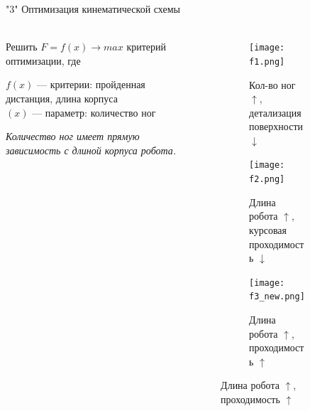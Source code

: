 \begin{frame}[t]{"3" Оптимизация кинематической схемы}
    \framesubtitle{}
    \begin{columns}[T,onlytextwidth]
        \begin{column}{0.49\textwidth}
            Решить $F=f(x) \rightarrow max$ критерий оптимизации, где

            $f(x)$ --- критерии: пройденная дистанция, длина корпуса\\
            $(x)$ --- параметр: количество ног

            \textit{Количество ног имеет прямую зависимость с длиной корпуса робота.}
        \end{column}
        \begin{column}{0.49\textwidth}
            \vspace{-0.5cm}
            \begin{figure}[H]
                \begin{subfigure}{0.99\textwidth}
                    \centering\texttt{[image: f1.png]}
                    \caption*{Кол-во ног $\uparrow$, детализация поверхности $\downarrow$}
                \end{subfigure}

                \begin{subfigure}{0.99\textwidth}
                    \centering\texttt{[image: f2.png]}
                    \caption*{Длина робота $\uparrow$, курсовая проходимость $\downarrow$}
                \end{subfigure}

                \begin{subfigure}{0.99\textwidth}
                    \centering\texttt{[image: f3\_new.png]}
                    \caption*{Длина робота $\uparrow$, проходимость $\uparrow$}
                \end{subfigure}
            \end{figure}
        \end{column}
    \end{columns}
\end{frame}

